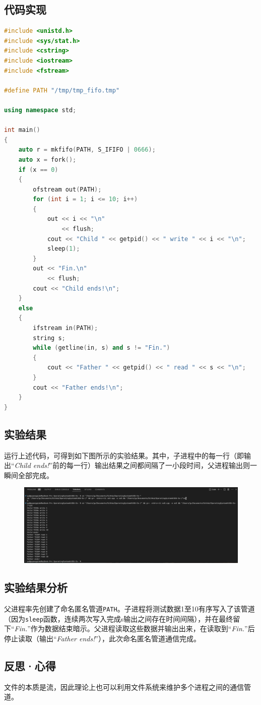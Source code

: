 \documentclass[UTF8]{ctexart}
\begin{document}
\subsection{代码实现}
\begin{lstlisting}[language=c++]
#include <unistd.h>
#include <sys/stat.h>
#include <cstring>
#include <iostream>
#include <fstream>

#define PATH "/tmp/tmp_fifo.tmp"

using namespace std;

int main()
{
    auto r = mkfifo(PATH, S_IFIFO | 0666);
    auto x = fork();
    if (x == 0)
    {
        ofstream out(PATH);
        for (int i = 1; i <= 10; i++)
        {
            out << i << "\n"
                << flush;
            cout << "Child " << getpid() << " write " << i << "\n";
            sleep(1);
        }
        out << "Fin.\n"
            << flush;
        cout << "Child ends!\n";
    }
    else
    {
        ifstream in(PATH);
        string s;
        while (getline(in, s) and s != "Fin.")
        {
            cout << "Father " << getpid() << " read " << s << "\n";
        }
        cout << "Father ends!\n";
    }
}
\end{lstlisting}
\subsection{实验结果}
运行上述代码，可得到如下图所示的实验结果。其中，子进程中的每一行（即输出“\textit{Child ends!}”前的每一行）输出结果之间都间隔了一小段时间，父进程输出则一瞬间全部完成。
\begin{figure}[htbp]
	\begin{center}
		\includegraphics[width=0.8\pdfpagewidth]{os5.png}
	\end{center}
\end{figure}
\subsection{实验结果分析}
父进程率先创建了命名匿名管道\texttt{PATH}。子进程将测试数据1至10有序写入了该管道（因为\texttt{sleep}函数，连续两次写入完成s输出之间存在时间间隔），并在最终留下“\textit{Fin.}”作为数据结束暗示。父进程读取这些数据并输出出来，在读取到“\textit{Fin.}”后停止读取（输出“\textit{Father ends!}”），此次命名匿名管道通信完成。
\subsection{反思·心得}
文件的本质是流，因此理论上也可以利用文件系统来维护多个进程之间的通信管道。
\end{document}
